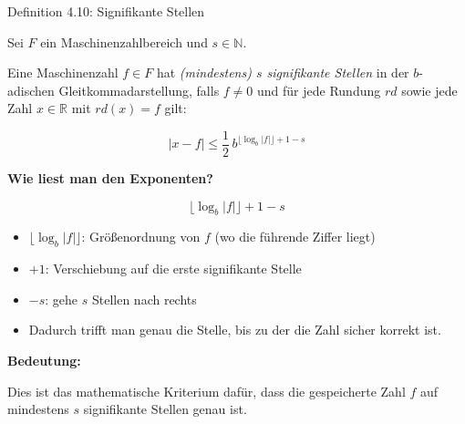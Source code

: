 \documentclass{beamer}
\begin{document}
\begin{frame}{Definition 4.10: Signifikante Stellen}

\scriptsize

Sei \(F\) ein Maschinenzahlbereich und \(s\in\mathbb{N}\).

Eine Maschinenzahl \(f\in F\) hat \emph{(mindestens) \(s\) signifikante Stellen}
in der \(b\)-adischen Gleitkommadarstellung, falls \(f\neq 0\) und für jede
Rundung \(rd\) sowie jede Zahl \(x\in\mathbb{R}\) mit \(rd(x)=f\) gilt:

\[
|x-f|
\le
\frac{1}{2}\, b^{\lfloor \log_b |f| \rfloor +1-s}
\]

\vspace{0.2cm}

\textbf{Wie liest man den Exponenten?}

\[
\lfloor \log_b |f| \rfloor +1-s
\]

\begin{itemize}
\item \(\lfloor \log_b |f| \rfloor\): Größenordnung von \(f\)
      (wo die führende Ziffer liegt)
\item \(+1\): Verschiebung auf die erste signifikante Stelle
\item \(-s\): gehe \(s\) Stellen nach rechts
\item Dadurch trifft man genau die Stelle,
      bis zu der die Zahl sicher korrekt ist.
\end{itemize}

\vspace{0.2cm}

\textbf{Bedeutung:}

Dies ist das mathematische Kriterium dafür, dass die gespeicherte Zahl \(f\)
auf mindestens \(s\) signifikante Stellen genau ist.

\end{frame}
\end{document}
